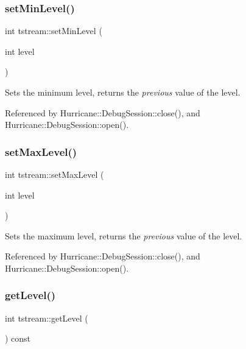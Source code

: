 \subsubsection{\texorpdfstring{set\+Min\+Level()}{setMinLevel()}}
{\footnotesize\ttfamily int tstream\+::set\+Min\+Level (\begin{DoxyParamCaption}\item[{int}]{level }\end{DoxyParamCaption})\hspace{0.3cm}{\ttfamily [inline]}}

Sets the minimum level, returns the {\itshape previous} value of the level. 

Referenced by Hurricane\+::\+Debug\+Session\+::close(), and Hurricane\+::\+Debug\+Session\+::open().

\mbox{\label{clasststream_a75cb778234d7b49d9e89c73e6efcd132}} 
\subsubsection{\texorpdfstring{set\+Max\+Level()}{setMaxLevel()}}
{\footnotesize\ttfamily int tstream\+::set\+Max\+Level (\begin{DoxyParamCaption}\item[{int}]{level }\end{DoxyParamCaption})\hspace{0.3cm}{\ttfamily [inline]}}

Sets the maximum level, returns the {\itshape previous} value of the level. 

Referenced by Hurricane\+::\+Debug\+Session\+::close(), and Hurricane\+::\+Debug\+Session\+::open().

\mbox{\label{clasststream_a01c90e5cc80064cae20d3a4bc3320683}} 
\subsubsection{\texorpdfstring{get\+Level()}{getLevel()}}
{\footnotesize\ttfamily int tstream\+::get\+Level (\begin{DoxyParamCaption}{ }\end{DoxyParamCaption}) const\hspace{0.3cm}{\ttfamily [inline]}}

